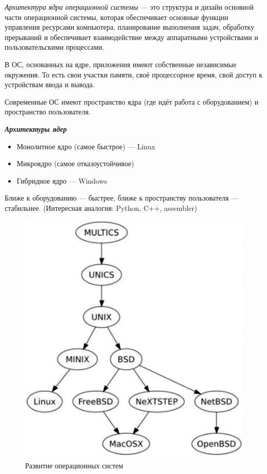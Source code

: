 \documentclass[oneside, final, 14pt]{extreport} %
\begin{document}
\textit{Архитектура ядра операционной системы} --- это структура и дизайн основной части операционной системы, которая обеспечивает основные функции управления ресурсами компьютера, планирование выполнения задач, обработку прерываний и обеспечивает взаимодействие между аппаратными устройствами и пользовательскими процессами.

В ОС, основанных на ядре, приложения имеют собственные независимые окружения. То есть
свои участки памяти, своё процессорное время, свой доступ к устройствам 
ввода и вывода.


Современные ОС имеют пространство ядра (где идёт работа с оборудованием)
и пространство пользователя.

\textit{\textbf{Архитектуры ядер}}
\begin{itemize}
    \item Монолитное ядро (самое быстрое) --- Linux
    \item Микроядро (самое отказоустойчивое)
    \item Гибридное ядро --- Windows
\end{itemize}

Ближе к оборудованию --- быстрее, ближе к пространству пользователя --- стабильнее.
(Интересная аналогия: Python, C++, assembler)

\begin{figure}[t]
    \centering
    \includegraphics[height=0.3\textheight]{2.png}
    \caption{Развитие операционных систем}
    \label{fig:2}

\end{figure}
\end{document}
